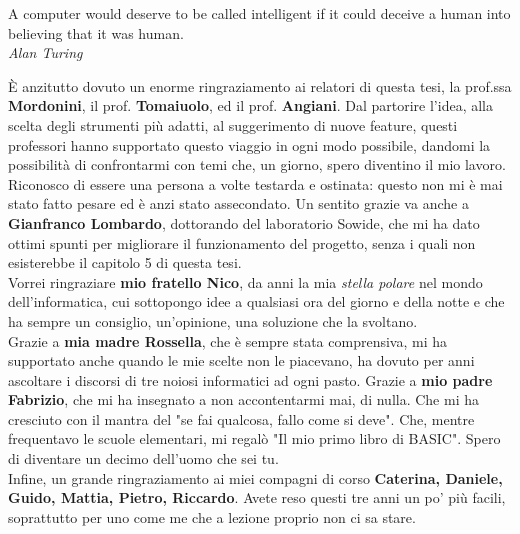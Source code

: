 \documentclass[trieste,corpo=11pt,numerazioneromana]{toptesi}
\begin{document}

\begin{flushright}
  \noindent
  A computer would deserve to be called intelligent if it could deceive a human into believing that it was human.\\
  \small{\textit{Alan Turing}}
\end{flushright}
\cleardoublepage


\ringraziamenti
È anzitutto dovuto un enorme ringraziamento ai relatori di questa tesi, la prof.ssa \textbf{Mordonini}, il prof. \textbf{Tomaiuolo}, ed il prof. \textbf{Angiani}. Dal partorire l'idea, alla scelta degli strumenti più adatti, al suggerimento di nuove feature, questi professori hanno supportato questo viaggio in ogni modo possibile, dandomi la possibilità di confrontarmi con temi che, un giorno, spero diventino il mio lavoro. Riconosco di essere una persona a volte testarda e ostinata: questo non mi è mai stato fatto pesare ed è anzi stato assecondato. Un sentito grazie va anche a \textbf{Gianfranco Lombardo}, dottorando del laboratorio Sowide, che mi ha dato ottimi spunti per migliorare il funzionamento del progetto, senza i quali non esisterebbe il capitolo 5 di questa tesi. \\
Vorrei ringraziare \textbf{mio fratello Nico}, da anni la mia \textit{stella polare} nel mondo dell'informatica, cui sottopongo idee a qualsiasi ora del giorno e della notte e che ha sempre un consiglio, un'opinione, una soluzione che la svoltano.\\
Grazie a \textbf{mia madre Rossella}, che è sempre stata comprensiva, mi ha supportato anche quando le mie scelte non le piacevano, ha dovuto per anni ascoltare i discorsi di tre noiosi informatici ad ogni pasto.
Grazie a \textbf{mio padre Fabrizio}, che mi ha insegnato a non accontentarmi mai, di nulla. Che mi ha cresciuto con il mantra del "se fai qualcosa, fallo come si deve". Che, mentre frequentavo le scuole elementari, mi regalò "Il mio primo libro di BASIC". Spero di diventare un decimo dell'uomo che sei tu.\\
Infine, un grande ringraziamento ai miei compagni di corso \textbf{Caterina, Daniele, Guido, Mattia, Pietro, Riccardo}. Avete reso questi tre anni un po' più facili, soprattutto per uno come me che a lezione proprio non ci sa stare.
\end{document}
